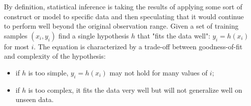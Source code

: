 By deﬁnition, statistical inference is taking the results of applying some sort of construct or model to speciﬁc data and then speculating that it would continue to perform well beyond the original observation range. Given a set of training samples \((x_i,y_i)\) ﬁnd a single hypothesis \(h\) that "fits the data well": \(y_i = h(x_i)\) for most \(i\). The equation is characterized by a trade-off between goodness-of-ﬁt and complexity of the hypothesis:

\begin{itemize}
\item if \(h\) is too simple, \(y_i = h(x_i)\) may not hold for many values of \(i\);
\item if \(h\) is too complex, it fits the data very well but will not generalize well on unseen data.
\end{itemize}


